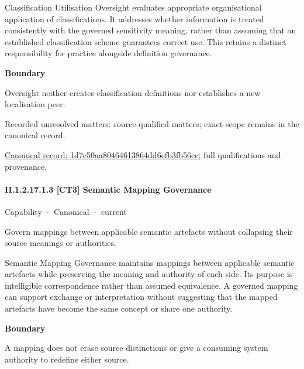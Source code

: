 Classification Utilisation Oversight evaluates appropriate organisational application of classifications. It addresses whether information is treated consistently with the governed sensitivity meaning, rather than assuming that an established classification scheme guarantees correct use. This retains a distinct responsibility for practice alongside definition governance.



\textbf{Boundary}



Oversight neither creates classification definitions nor establishes a new localisation peer.


{\small Recorded unresolved matters: source-qualified matters; exact scope remains in the canonical record.}\par
{\footnotesize \href{../../../../continuum/strategy/capability/1d7c50aa80464613864dd6efb3fb56cc.md}{Canonical record: 1d7c50aa80464613864dd6efb3fb56cc}; full qualifications and provenance.}\par
\paragraph*{II.1.2.17.1.3 [CT3] Semantic Mapping Governance}
\label{navigation:II.1.2.17.1.3}

\label{element:17dc6ab9f4394049a5327415d19628f2}
{\small Capability · Canonical · current}\par

Govern mappings between applicable semantic artefacts without collapsing their source meanings or authorities.



Semantic Mapping Governance maintains mappings between applicable semantic artefacts while preserving the meaning and authority of each side. Its purpose is intelligible correspondence rather than assumed equivalence. A governed mapping can support exchange or interpretation without suggesting that the mapped artefacts have become the same concept or share one authority.



\textbf{Boundary}



A mapping does not erase source distinctions or give a consuming system authority to redefine either source.



